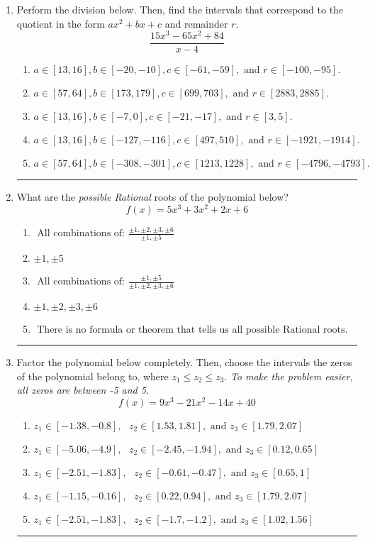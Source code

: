 \documentclass[14pt]{extbook}
\newcommand{\litem}[1]{\item#1\hspace*{-1cm}\rule{\textwidth}{0.4pt}}
\begin{document}
\begin{enumerate}
{\begin{enumerate}[label=\Alph*.]
\end{enumerate} }
\litem{
Perform the division below. Then, find the intervals that correspond to the quotient in the form $ax^2+bx+c$ and remainder $r$.\[ \frac{15x^{3} -65 x^{2} + 84}{x -4} \]\begin{enumerate}[label=\Alph*.]
\item \( a \in [13, 16], b \in [-20, -10], c \in [-61, -59], \text{ and } r \in [-100, -95]. \)
\item \( a \in [57, 64], b \in [173, 179], c \in [699, 703], \text{ and } r \in [2883, 2885]. \)
\item \( a \in [13, 16], b \in [-7, 0], c \in [-21, -17], \text{ and } r \in [3, 5]. \)
\item \( a \in [13, 16], b \in [-127, -116], c \in [497, 510], \text{ and } r \in [-1921, -1914]. \)
\item \( a \in [57, 64], b \in [-308, -301], c \in [1213, 1228], \text{ and } r \in [-4796, -4793]. \)

\end{enumerate} }
\litem{
What are the \textit{possible Rational} roots of the polynomial below?\[ f(x) = 5x^{3} +3 x^{2} +2 x + 6 \]\begin{enumerate}[label=\Alph*.]
\item \( \text{ All combinations of: }\frac{\pm 1,\pm 2,\pm 3,\pm 6}{\pm 1,\pm 5} \)
\item \( \pm 1,\pm 5 \)
\item \( \text{ All combinations of: }\frac{\pm 1,\pm 5}{\pm 1,\pm 2,\pm 3,\pm 6} \)
\item \( \pm 1,\pm 2,\pm 3,\pm 6 \)
\item \( \text{ There is no formula or theorem that tells us all possible Rational roots.} \)

\end{enumerate} }
\litem{
Factor the polynomial below completely. Then, choose the intervals the zeros of the polynomial belong to, where $z_1 \leq z_2 \leq z_3$. \textit{To make the problem easier, all zeros are between -5 and 5.}\[ f(x) = 9x^{3} -21 x^{2} -14 x + 40 \]\begin{enumerate}[label=\Alph*.]
\item \( z_1 \in [-1.38, -0.8], \text{   }  z_2 \in [1.53, 1.81], \text{   and   } z_3 \in [1.79, 2.07] \)
\item \( z_1 \in [-5.06, -4.9], \text{   }  z_2 \in [-2.45, -1.94], \text{   and   } z_3 \in [0.12, 0.65] \)
\item \( z_1 \in [-2.51, -1.83], \text{   }  z_2 \in [-0.61, -0.47], \text{   and   } z_3 \in [0.65, 1] \)
\item \( z_1 \in [-1.15, -0.16], \text{   }  z_2 \in [0.22, 0.94], \text{   and   } z_3 \in [1.79, 2.07] \)
\item \( z_1 \in [-2.51, -1.83], \text{   }  z_2 \in [-1.7, -1.2], \text{   and   } z_3 \in [1.02, 1.56] \)


\end{enumerate}}
\end{enumerate}
\end{document}

